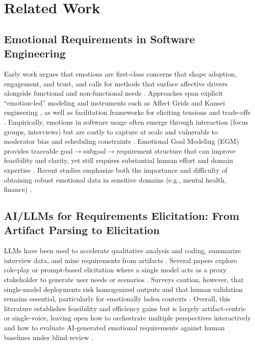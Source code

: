 \documentclass[acmsmall]{acmart}
\begin{document}
\section{Related Work}
\label{sec:related}

\subsection{Emotional Requirements in Software Engineering}
Early work argues that emotions are first‑class concerns that shape adoption, engagement, and trust, and calls for methods that surface affective drivers alongside functional and non‑functional needs \cite{miller2015emotion,curumsing2014designing,hadiana2020emotional}. Approaches span explicit “emotion‑led” modeling and instruments such as Affect Grids and Kansei engineering \cite{colomo2011using,hadiana2020emotional}, as well as facilitation frameworks for eliciting tensions and trade‑offs \cite{miller2015emotion,curumsing2014designing}. Empirically, emotions in software usage often emerge through interaction (focus groups, interviews) but are costly to capture at scale and vulnerable to moderator bias and scheduling constraints \cite{alkhomsan2024eliciting,thew2018value,ortu2016emotional}. Emotional Goal Modeling (EGM) provides traceable goal$\rightarrow$subgoal$\rightarrow$requirement structure that can improve feasibility and clarity, yet still requires substantial human effort and domain expertise \cite{curumsing2014designing,hadiana2020emotional}. Recent studies emphasize both the importance and difficulty of obtaining robust emotional data in sensitive domains (e.g., mental health, finance) \cite{madampe2022emotional}.
\subsection{AI/LLMs for Requirements Elicitation: From Artifact Parsing to Elicitation}
LLMs have been used to accelerate qualitative analysis and coding, summarize interview data, and mine requirements from artifacts \cite{barros2025large,schroeder2024large,omizo2024automating,than2025updating,crocker2025proof,castellanos2025large}. Several papers explore role‑play or prompt‑based elicitation where a single model acts as a proxy stakeholder to generate user needs or scenarios \cite{marques2024using,lojo2025using,ferrari2025formal,zhang2024focus}. Surveys caution, however, that single‑model deployments risk homogenized outputs and that human validation remains essential, particularly for emotionally laden contexts \cite{bano2023ai}. Overall, this literature establishes feasibility and efficiency gains but is largely artifact‑centric or single‑voice, leaving open how to orchestrate multiple perspectives interactively and how to evaluate AI‑generated emotional requirements against human baselines under blind review \cite{bano2024large,hayes2025conversing}.
\end{document}

